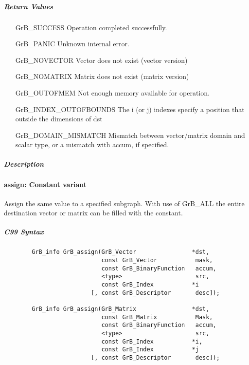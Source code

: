 \subparagraph{Return Values}

\begin{itemize}[leftmargin=2.1in]
\item[{\sf GrB\_SUCCESS}]             Operation completed successfully.
\item[{\sf GrB\_PANIC}]               Unknown internal error.
\item[{\sf GrB\_NOVECTOR}]            Vector does not exist (vector version)
\item[{\sf GrB\_NOMATRIX}]            Matrix does not exist (matrix version)
\item[{\sf GrB\_OUTOFMEM}]            Not enough memory available for operation.
\item[{\sf GrB\_INDEX\_OUTOFBOUNDS}]  The i (or j) indexes specify a position that outside the dimensions of dst
\item[{\sf GrB\_DOMAIN\_MISMATCH}]    Mismatch between vector/matrix domain and scalar type,
                                      or a mismatch with {\sf accum}, if specified.
\end{itemize}

\subparagraph{Description}

\paragraph{{\sf assign}: Constant variant}

Assign the same value to a specified subgraph.  With use of {\sf GrB\_ALL} the entire
destination vector or matrix can be filled with the constant.


\subparagraph{C99 Syntax}

\begin{verbatim}
        GrB_info GrB_assign(GrB_Vector                *dst,
                            const GrB_Vector           mask,
                            const GrB_BinaryFunction   accum,
                            <type>                     src,
                            const GrB_Index           *i
                         [, const GrB_Descriptor       desc]);

        GrB_info GrB_assign(GrB_Matrix                *dst,
                            const GrB_Matrix           Mask,
                            const GrB_BinaryFunction   accum,
                            <type>                     src,
                            const GrB_Index           *i,
                            const GrB_Index           *j
                         [, const GrB_Descriptor       desc]);
\end{verbatim}

